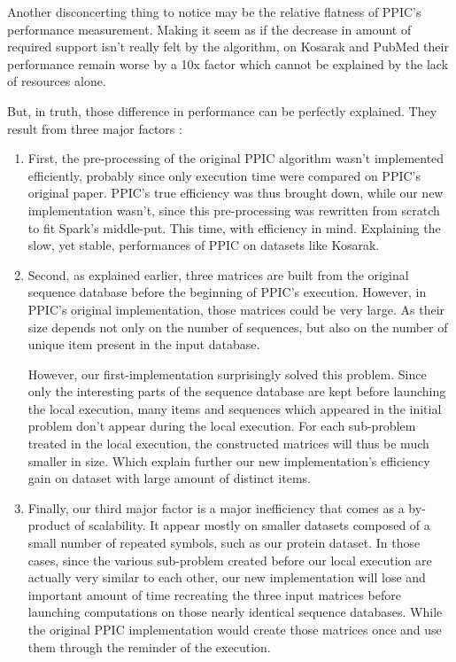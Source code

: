 \documentclass{eplmastersthesis}
\begin{document}
Another disconcerting thing to notice may be the relative flatness of PPIC's performance measurement. Making it seem as if the decrease in amount of required support isn't really felt by the algorithm, on Kosarak and PubMed their performance remain worse by a 10x factor which cannot be explained by the lack of resources alone. \newline

But, in truth, those difference in performance can be perfectly explained. They result from three major factors :
\begin{enumerate}
\item First, the pre-processing of the original PPIC algorithm wasn't implemented efficiently, probably since only execution time were compared on PPIC's original paper. PPIC's true efficiency was thus brought down, while our new implementation wasn't, since this pre-processing was rewritten from scratch to fit Spark's middle-put. This time, with efficiency in mind. Explaining the slow, yet stable, performances of PPIC on datasets like Kosarak.

\item Second, as explained earlier, three matrices are built from the original sequence database before the beginning of PPIC's execution. However, in PPIC's original implementation, those matrices could be very large. As their size depends not only on the number of sequences, but also on the number of unique item present in the input database. \newline
	
	However, our first-implementation surprisingly solved this problem. Since only the interesting parts of the sequence database are kept before launching the local execution, many items and sequences which appeared in the initial problem don't appear during the local execution. For each sub-problem treated in the local execution, the constructed matrices will thus be much smaller in size. Which explain further our new implementation's efficiency gain on dataset with large amount of distinct items.
	
\item Finally, our third major factor is a major inefficiency that comes as a by-product of scalability. It appear mostly on smaller datasets composed of a small number of repeated symbols, such as our protein dataset. In those cases, since the various sub-problem created before our local execution are actually very similar to each other, our new implementation will lose and important amount of time recreating the three input matrices before launching computations on those nearly identical sequence databases. While the original PPIC implementation would create those matrices once and use them through the reminder of the execution. \newline


\end{enumerate}
\end{document}
